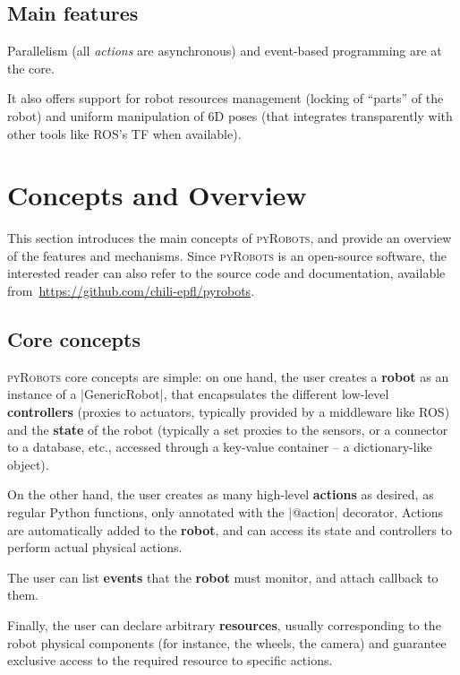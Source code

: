 \documentclass[a4paper, 10pt, conference]{ieeeconf}      %
\newcommand{\pyRobots}{\textsc{pyRobots}}
\begin{document}
\subsection{Main features}

Parallelism (all \emph{actions} are asynchronous) and event-based programming
are at the core.

It also offers support for robot resources management (locking of ``parts'' of
the robot) and uniform manipulation of 6D poses (that integrates transparently
with other tools like ROS's TF when available).

\section{Concepts and Overview}

This section introduces the main concepts of \pyRobots{},
and provide an overview of the features and mechanisms. Since \pyRobots{} is an
open-source software, the interested reader can also refer to the source code
and documentation, available from~\url{https://github.com/chili-epfl/pyrobots}.

\subsection{Core concepts}

\pyRobots{} core concepts are simple: on one hand, the user creates a
\textbf{robot} as an instance of a \python|GenericRobot|, that encapsulates the
different low-level \textbf{controllers} (proxies to actuators, typically
provided by a middleware like ROS) and the \textbf{state} of the robot
(typically a set proxies to the sensors, or a connector to a database, etc.,
accessed through a key-value container -- a dictionary-like object).

On the other hand, the user creates as many high-level \textbf{actions} as
desired, as regular Python functions, only annotated with the \python|@action|
decorator. Actions are automatically added to the \textbf{robot}, and can access
its state and controllers to perform actual physical actions.

The user can list \textbf{events} that the \textbf{robot} must monitor, and
attach callback to them.

Finally, the user can declare arbitrary \textbf{resources}, usually
corresponding to the robot physical components (for instance, the wheels, the
camera) and guarantee exclusive access to the required resource to specific
actions.
\end{document}
